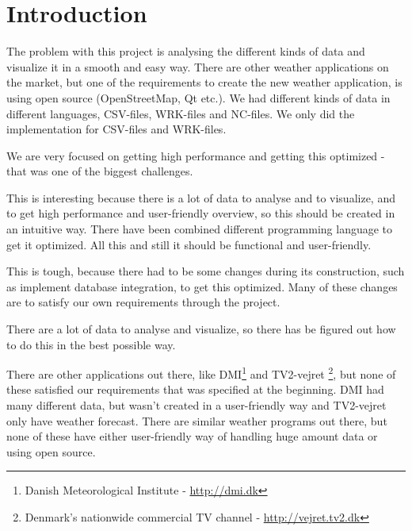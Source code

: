 \chapter{Introduction}
\label{sec:introduction}



The problem with this project is analysing the different kinds of data and visualize it in a smooth and easy way. There are other weather applications on the market, but one of the requirements to create the new weather application, is using open source (OpenStreetMap, Qt etc.). We had different kinds of data in different languages, CSV-files, WRK-files and NC-files. We only did the implementation for CSV-files and WRK-files.

We are very focused on getting high performance and getting this optimized - that was one of the biggest challenges.

This is interesting because there is a lot of data to analyse and to visualize, and to get high performance and user-friendly overview, so this should be created in an intuitive way. There have been combined different programming language to get it optimized. All this and still it should be functional and user-friendly.

This is tough, because there had to be some changes during its construction, such as implement database integration, to get this optimized. Many of these changes are to satisfy our own requirements through the project.

There are a lot of data to analyse and visualize, so there has be figured out how to do this in the best possible way.

There are other applications out there, like DMI\footnote{Danish Meteorological Institute - \url{http://dmi.dk}} and TV2-vejret \footnote{Denmark's nationwide commercial TV channel - \url{http://vejret.tv2.dk}}, but none of these satisfied our requirements that was specified at the beginning. DMI had many different data, but wasn't created in a user-friendly way and TV2-vejret only have weather forecast. There are similar weather programs out there, but none of these have either user-friendly way of handling huge amount data or using open source.

